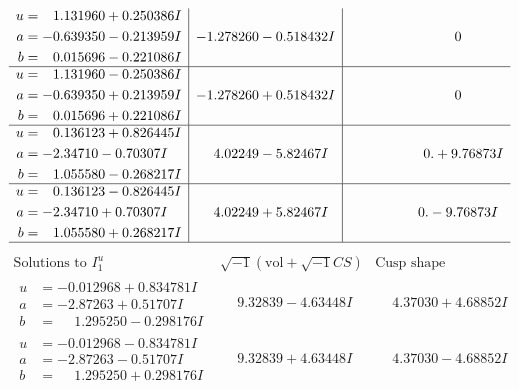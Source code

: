 \documentclass[1p]{elsarticle_modified}
\theoremstyle{definition}
\newcommand{\I}{\sqrt{-1}}
\begin{document}
$$\begin{array}{c|c|c}
\begin{aligned}
u &= \phantom{-}1.131960 + 0.250386 I \\
a &= -0.639350 - 0.213959 I \\
b &= \phantom{-}0.015696 - 0.221086 I\end{aligned}
 & -1.278260 - 0.518432 I & \phantom{-0.000000 } 0 \\ \hline\begin{aligned}
u &= \phantom{-}1.131960 - 0.250386 I \\
a &= -0.639350 + 0.213959 I \\
b &= \phantom{-}0.015696 + 0.221086 I\end{aligned}
 & -1.278260 + 0.518432 I & \phantom{-0.000000 } 0 \\ \hline\begin{aligned}
u &= \phantom{-}0.136123 + 0.826445 I \\
a &= -2.34710 - 0.70307 I \\
b &= \phantom{-}1.055580 - 0.268217 I\end{aligned}
 & \phantom{-}4.02249 - 5.82467 I & \phantom{-0.000000 -}0. + 9.76873 I \\ \hline\begin{aligned}
u &= \phantom{-}0.136123 - 0.826445 I \\
a &= -2.34710 + 0.70307 I \\
b &= \phantom{-}1.055580 + 0.268217 I\end{aligned}
 & \phantom{-}4.02249 + 5.82467 I & \phantom{-0.000000 } 0. - 9.76873 I\\
 \hline 
 \end{array}$$\newpage$$\begin{array}{c|c|c}  
\text{Solutions to }I^u_{1}& \I (\text{vol} + \sqrt{-1}CS) & \text{Cusp shape}\\
 \hline 
\begin{aligned}
u &= -0.012968 + 0.834781 I \\
a &= -2.87263 + 0.51707 I \\
b &= \phantom{-}1.295250 - 0.298176 I\end{aligned}
 & \phantom{-}9.32839 - 4.63448 I & \phantom{-}4.37030 + 4.68852 I \\ \hline\begin{aligned}
u &= -0.012968 - 0.834781 I \\
a &= -2.87263 - 0.51707 I \\
b &= \phantom{-}1.295250 + 0.298176 I\end{aligned}
 & \phantom{-}9.32839 + 4.63448 I & \phantom{-}4.37030 - 4.68852 I \\ \hline\begin{aligned}

\end{aligned}
\end{array}$$
\end{document}
